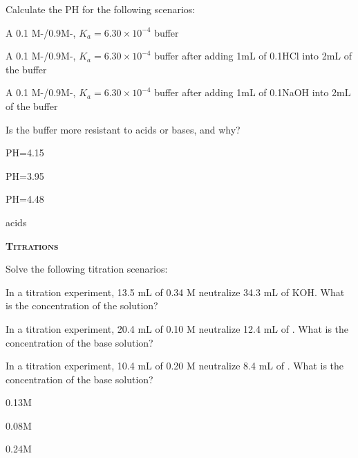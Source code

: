 \documentclass[main.tex]{subfiles}
\begin{document}
\begin{multicols*}{2}
\begin{question}[ID=\the\value{numA}]
Calculate the PH for the following scenarios:
\begin{inparaenum}[(a)]
\item A 0.1 M-/0.9M-, $K_a=6.30 \times 10^{-4}$ buffer  %
\item A 0.1 M-/0.9M-, $K_a=6.30 \times 10^{-4}$ buffer after adding 1mL of 0.1HCl into 2mL of the buffer %
\item A 0.1 M-/0.9M-, $K_a=6.30 \times 10^{-4}$ buffer after adding 1mL of 0.1NaOH into 2mL of the buffer %
\item Is the buffer more resistant to acids or bases, and why?
 \end{inparaenum}
\end{question}
\begin{solution}
\begin{inparaenum}[(a)]
\item  PH=4.15 
\item  PH=3.95 
\item  PH=4.48 
\item acids
 \end{inparaenum}
\hspace{0.1cm}\end{solution}%


{\raggedright\textsc{\textbf{Titrations}}\par}
\begin{question}[ID=\the\value{numA}]
Solve the following titration scenarios:
\begin{inparaenum}[(a)]
\item In a titration experiment, 13.5 mL of 0.34 M  neutralize 34.3 mL of KOH. What is the concentration of the  solution? %
\item In a titration experiment, 20.4 mL of 0.10 M  neutralize 12.4 mL of . What is the concentration of the base solution? %
\item In a titration experiment, 10.4 mL of 0.20 M  neutralize 8.4 mL of . What is the concentration of the base solution? %
 \end{inparaenum}
\end{question}
\begin{solution}
\begin{inparaenum}[(a)]
\item  0.13M
\item  0.08M
\item  0.24M
 \end{inparaenum}
\hspace{0.1cm}\end{solution}%



\end{multicols*}
\end{document}
